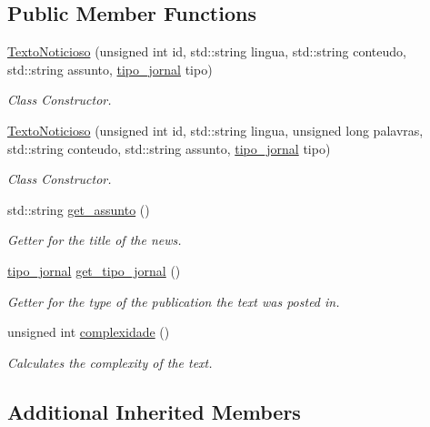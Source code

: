 \subsection*{Public Member Functions}
\begin{DoxyCompactItemize}
\item 
\hyperlink{class_texto_noticioso_a74a984b14609c5ad38a32cefcc5c9da7}{Texto\-Noticioso} (unsigned int id, std\-::string lingua, std\-::string conteudo, std\-::string assunto, \hyperlink{_texto_noticioso_8h_adbee2daefeb8a5b2ec0e0c0b353390d5}{tipo\-\_\-jornal} tipo)
\begin{DoxyCompactList}\small\item\em Class Constructor. \end{DoxyCompactList}\item 
\hyperlink{class_texto_noticioso_a9b82b7cd28537c9aa6c214d3439ab6f5}{Texto\-Noticioso} (unsigned int id, std\-::string lingua, unsigned long palavras, std\-::string conteudo, std\-::string assunto, \hyperlink{_texto_noticioso_8h_adbee2daefeb8a5b2ec0e0c0b353390d5}{tipo\-\_\-jornal} tipo)
\begin{DoxyCompactList}\small\item\em Class Constructor. \end{DoxyCompactList}\item 
std\-::string \hyperlink{class_texto_noticioso_afd686397a10b9e6afa8eb9f1aaf5d21e}{get\-\_\-assunto} ()
\begin{DoxyCompactList}\small\item\em Getter for the title of the news. \end{DoxyCompactList}\item 
\hyperlink{_texto_noticioso_8h_adbee2daefeb8a5b2ec0e0c0b353390d5}{tipo\-\_\-jornal} \hyperlink{class_texto_noticioso_ac0edd9121ef61cb4adc360faabecd62b}{get\-\_\-tipo\-\_\-jornal} ()
\begin{DoxyCompactList}\small\item\em Getter for the type of the publication the text was posted in. \end{DoxyCompactList}\item 
unsigned int \hyperlink{class_texto_noticioso_a1db491d92e2a467d258f0f470f994981}{complexidade} ()
\begin{DoxyCompactList}\small\item\em Calculates the complexity of the text. \end{DoxyCompactList}\end{DoxyCompactItemize}
\subsection*{Additional Inherited Members}



